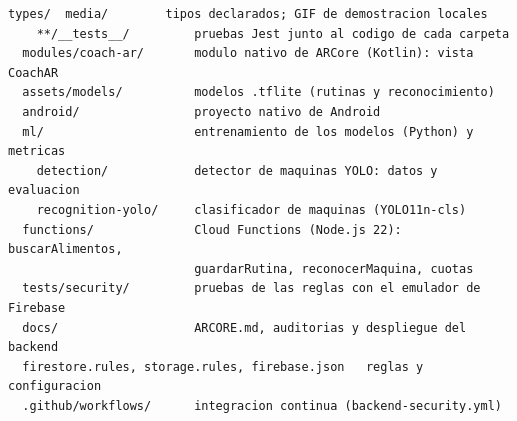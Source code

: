 \begin{lstlisting}[language={}, numbers=none, caption={Estructura de carpetas del código fuente}, label={lst:estructura}]
    types/  media/        tipos declarados; GIF de demostracion locales
    **/__tests__/         pruebas Jest junto al codigo de cada carpeta
  modules/coach-ar/       modulo nativo de ARCore (Kotlin): vista CoachAR
  assets/models/          modelos .tflite (rutinas y reconocimiento)
  android/                proyecto nativo de Android
  ml/                     entrenamiento de los modelos (Python) y metricas
    detection/            detector de maquinas YOLO: datos y evaluacion
    recognition-yolo/     clasificador de maquinas (YOLO11n-cls)
  functions/              Cloud Functions (Node.js 22): buscarAlimentos,
                          guardarRutina, reconocerMaquina, cuotas
  tests/security/         pruebas de las reglas con el emulador de Firebase
  docs/                   ARCORE.md, auditorias y despliegue del backend
  firestore.rules, storage.rules, firebase.json   reglas y configuracion
  .github/workflows/      integracion continua (backend-security.yml)
\end{lstlisting}
